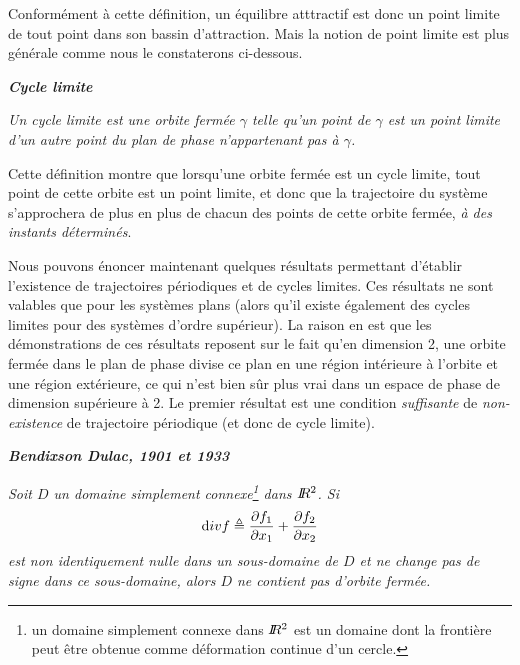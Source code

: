 {Conform{é}ment {à} cette d{é}finition, un {é}quilibre atttractif est donc un
point limite de tout point dans son bassin d'attraction. Mais la
notion de point limite est plus g{é}n{é}rale comme nous le
constaterons ci-dessous.

\begin{definition}{\bf \em Cycle limite}

{\em Un {\em cycle limite} est une orbite ferm{é}e $\gamma$ telle qu'un point de $\gamma$ est
un point limite d'un autre point du plan de phase n'appartenant pas
 {à} $\gamma$.}\cqfd\end{definition}
   
Cette d{é}finition montre que lorsqu'une orbite ferm{é}e est un cycle
limite, tout point de cette orbite est un point limite, et donc que la
trajectoire du syst{è}me s'approchera de plus en plus de chacun des
points de cette orbite ferm{é}e, {\em {à} des instants
  d{é}termin{é}s}.

Nous pouvons {é}noncer maintenant quelques r{é}sultats permettant d'{é}tablir l'existence
de trajectoires p{é}riodiques et de cycles limites. Ces r{é}sultats ne sont valables que
pour les syst{è}mes plans (alors qu'il existe également des cycles limites
pour des syst{è}mes d'ordre sup{é}rieur). La raison en est que les d{é}monstrations de ces
r{é}sultats reposent sur le fait qu'en dimension 2, une orbite ferm{é}e dans le plan de
phase divise ce plan en une r{é}gion int{é}rieure {à} l'orbite et une r{é}gion
ext{é}rieure, ce qui n'est bien s{\^u}r plus vrai dans un espace de phase de dimension
sup{é}rieure à 2.
Le premier r{é}sultat est une condition {\em suffisante} de {\em non-existence} de
trajectoire p{é}riodique (et donc de cycle limite).

\begin{theoreme} {\bf \em Bendixson Dulac, 1901 et 1933} 

{\em
Soit $D$ un domaine simplement connexe\footnote{un domaine simplement connexe dans  $I \! \! R^2$ est un
domaine dont la fronti{è}re peut {ê}tre obtenue comme d{é}formation continue d'un cercle.}
dans $I \! \! R^2$.  Si $${\mbox div}f \triangleq \frac{\partial f_1}{\partial
x_1}+\frac{\partial f_2}{\partial x_2}$$ est non identiquement nulle dans un sous-domaine
de $D$ et ne change pas de signe dans ce sous-domaine, alors $D$ ne contient pas d'orbite
ferm{é}e.}\cqfd\end{theoreme}

}
